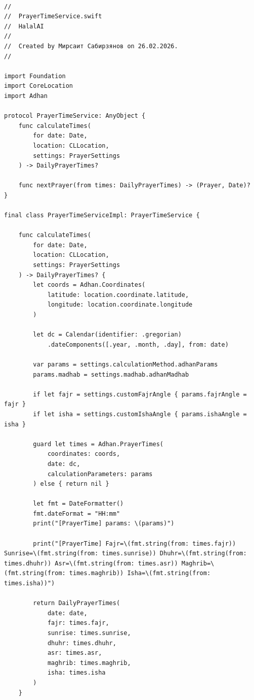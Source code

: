 \begin{lstlisting}[basicstyle=\tiny\ttfamily,breaklines=true]

//
//  PrayerTimeService.swift
//  HalalAI
//
//  Created by Мирсаит Сабирзянов on 26.02.2026.
//

import Foundation
import CoreLocation
import Adhan

protocol PrayerTimeService: AnyObject {
    func calculateTimes(
        for date: Date,
        location: CLLocation,
        settings: PrayerSettings
    ) -> DailyPrayerTimes?

    func nextPrayer(from times: DailyPrayerTimes) -> (Prayer, Date)?
}

final class PrayerTimeServiceImpl: PrayerTimeService {

    func calculateTimes(
        for date: Date,
        location: CLLocation,
        settings: PrayerSettings
    ) -> DailyPrayerTimes? {
        let coords = Adhan.Coordinates(
            latitude: location.coordinate.latitude,
            longitude: location.coordinate.longitude
        )

        let dc = Calendar(identifier: .gregorian)
            .dateComponents([.year, .month, .day], from: date)

        var params = settings.calculationMethod.adhanParams
        params.madhab = settings.madhab.adhanMadhab

        if let fajr = settings.customFajrAngle { params.fajrAngle = fajr }
        if let isha = settings.customIshaAngle { params.ishaAngle = isha }

        guard let times = Adhan.PrayerTimes(
            coordinates: coords,
            date: dc,
            calculationParameters: params
        ) else { return nil }

        let fmt = DateFormatter()
        fmt.dateFormat = "HH:mm"
        print("[PrayerTime] params: \(params)")

        print("[PrayerTime] Fajr=\(fmt.string(from: times.fajr)) Sunrise=\(fmt.string(from: times.sunrise)) Dhuhr=\(fmt.string(from: times.dhuhr)) Asr=\(fmt.string(from: times.asr)) Maghrib=\(fmt.string(from: times.maghrib)) Isha=\(fmt.string(from: times.isha))")

        return DailyPrayerTimes(
            date: date,
            fajr: times.fajr,
            sunrise: times.sunrise,
            dhuhr: times.dhuhr,
            asr: times.asr,
            maghrib: times.maghrib,
            isha: times.isha
        )
    }


\end{lstlisting}
